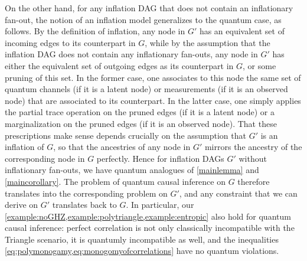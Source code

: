 \documentclass[aps,english,superscriptaddress,onecolumn,twoside,longbibliography,pra,floatfix,fleqn,nofootinbib]{revtex4-1}%
\theoremstyle{definition}
\newcounter{example}[section]
\begin{document}
On the other hand, for any inflation DAG that does not contain an inflationary fan-out, the notion of an inflation model generalizes to the quantum case, as follows.  By the definition of inflation, any node in $G'$ has an equivalent set of incoming edges to its counterpart in $G$, while by the assumption that the inflation DAG does not contain any inflationary fan-outs, any node in $G'$ has either the equivalent set of outgoing edges as its counterpart in $G$, or some pruning of this set.  In the former case, 
one associates to this node the same set of quantum channels (if it is a latent node) or measurements (if it is an observed node) that are associated to its counterpart. In the latter case, one simply applies the partial trace operation on the pruned edges (if it is a latent node) or a marginalization on the pruned edges (if it is an observed node).  
That these prescriptions make sense depends crucially on the assumption that $G'$ is an inflation of $G$, so that the ancestries of any node in $G'$ mirrors the ancestry of the corresponding node in $G$ perfectly. Hence for inflation DAGs $G'$ without inflationary fan-outs, we have quantum analogues of \cref{mainlemma} and \cref{maincorollary}. The problem of quantum causal inference on $G$ therefore translates into the corresponding problem on $G'$, and any constraint that we can derive on $G'$ translates back to $G$. In particular, our \cref{example:noGHZ,example:polytriangle,example:entropic} also hold for quantum causal inference: perfect correlation is not only classically incompatible with the Triangle scenario, it is quantumly incompatible as well, and the inequalities \cref{eq:polymonogamy,eq:monogomyofcorrelations} have no quantum violations. 
\end{document}
